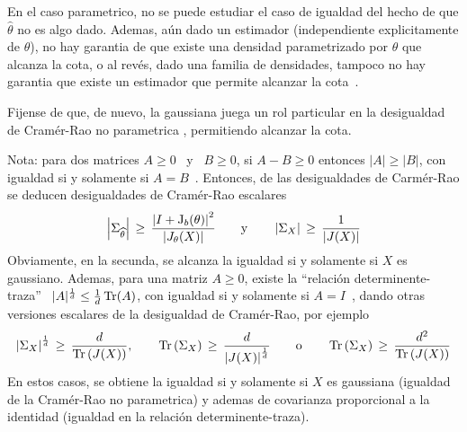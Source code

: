 %
\noindent En el  caso parametrico, no se puede estudiar el  caso de igualdad del
hecho  de  que  $\widehat{\theta}$ no  es  algo  dado.   Ademas, a\'un  dado  un
estimador  (independiente explicitamente de  $\theta$), no  hay garantia  de que
existe  una  densidad parametrizado  por  $\theta$ que  alcanza  la  cota, o  al
rev\'es, dado una  familia de densidades, tampoco no hay  garantia que existe un
estimador que permite alcanzar la cota~\cite{CovTho06, Kay93}.

Fijense de que, de nuevo, la gaussiana juega un rol particular en la desigualdad
de Cram\'er-Rao no parametrica , permitiendo alcanzar la cota.

Nota: para dos  matrices $A \ge 0$  \ y \ $B \ge  0$, si $A - B  \ge 0$ entonces
$|A|  \ge  |B|$,   con  igualdad  si  y  solamente   si  $A  =  B$~\cite[cap.~1,
teorema~25]{MagNeu99}.   Entonces,  de  las  desigualdades  de  Carm\'er-Rao  se
deducen     desigualdades     de     Cram\'er-Rao    escalares
%
\[
\left|   \Sigma_{\widehat{\theta}}  \right|   \,   \ge  \,   \frac{\left|  I   +
    \operatorname{J}_b(\theta) \right|^2}{\left| J_\theta(X) \right|} \qquad \mbox{y} \qquad
\left| \Sigma_X \right| \, \ge \, \frac{1}{\left| J(X) \right|}
\]
%
Obviamente,  en la secunda,  se alcanza  la igualdad  si y  solamente si  $X$ es
gaussiano.  Ademas,  para   una  matriz  $A  \ge  0$,   existe  la  ``relaci\'on
determinente-traza''  \ $|A|^{\frac1d} \le  \frac1d \operatorname{Tr}(A)$,  con igualdad  si y
solamente  si $A  = I$~\cite[cap.~11,  sec.~4]{MagNeu99}, dando  otras versiones
escalares de la desigualdad de Cram\'er-Rao, por ejemplo
%
\[
\left| \Sigma_X  \right|^{\frac1d} \,  \ge \, \frac{d}{\operatorname{Tr}\left(  J(X) \right)},
\qquad   \operatorname{Tr}\left(   \Sigma_X   \right)   \,   \ge   \,   \frac{d}{\left|   J(X)
  \right|^{\frac1d}} \qquad \mbox{o} \qquad \operatorname{Tr}\left( \Sigma_X \right) \, \ge \,
\frac{d^2}{\operatorname{Tr}\left( J(X) \right)}
\]
%
En  estos casos,  se obtiene  la igualdad  si y  solamente si  $X$  es gaussiana
(igualdad de la Cram\'er-Rao no parametrica) y ademas de covarianza proporcional
a la identidad (igualdad en la relaci\'on determinente-traza).

\

